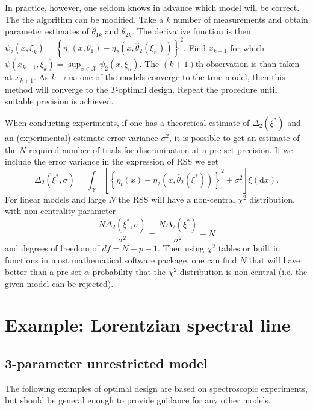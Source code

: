 \documentclass[12pt]{iopart}
\begin{document}
In practice, however, one seldom knows in advance which model will be correct. The the algorithm can be modified. Take a $k$ number of measurements and obtain parameter estimates of $\hat \theta_{1k}$ and $\hat \theta_{2k}$. The derivative function is then $\psi_2(x, \xi_k) = \left\{\eta_1(x, \theta_1) - \eta_2(x, \hat \theta_2(\xi_n))\right\}^2$. Find $x_{k+1}$ for which $\psi(x_{k+1}, \xi_k) = \sup_{x \in \mathcal{X}}\psi_2(x, \xi_n)$. The $(k+1)$th observation is than taken at $x_{k+1}$. As $k \rightarrow \infty$ one of the models converge to the true model, then this method will converge to the $T$-optimal design. Repeat the procedure until suitable precision is achieved.

When conducting experiments, if one has a theoretical estimate of $\Delta_2(\xi^*)$ and an (experimental) estimate error variance $\sigma^2$, it is possible to get an estimate of the $N$ required number of trials for discrimination at a pre-set precision. If we include the error variance in the  expression of RSS we get
\begin{equation}
\Delta_2(\xi^*, \sigma) = \int_{\mathcal{X}} \left[\left\{\eta_t(x) - \eta_2(x, \hat \theta_2(\xi^*))\right\}^2 + \sigma^2\right]\xi(\mathrm{d}x).
\label{eq:rssvar}
\end{equation}
For linear models and large $N$ the RSS will have a non-central $\chi^2$ distribution, with non-centrality parameter
\begin{equation}
\frac{N\Delta_2(\xi^*, \sigma)}{\sigma^2 } = \frac{N \Delta_2(\xi^*)}{\sigma^2} + N
\end{equation}
and degrees of freedom of $df = N - p - 1$. Then using $\chi^2$ tables or built in functions in most mathematical software package, one can find $N$ that will have better than a pre-set $\alpha$ probability that the $\chi^2$ distribution is non-central (i.e. the given model can be rejected).



\section{Example: Lorentzian spectral line}

\subsection{3-parameter unrestricted model}
\label{seq:exopt}

The following examples of optimal design are based on spectroscopic experiments, but should be general enough to provide guidance for any other models.
\end{document}
